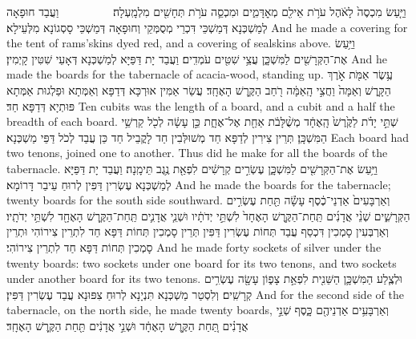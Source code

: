 {{וַיַּ֤עַשׂ מִכְסֶה֙ לָאֹ֔הֶל עֹרֹ֥ת אֵילִ֖ם מְאׇדָּמִ֑ים וּמִכְסֵ֛ה עֹרֹ֥ת תְּחָשִׁ֖ים מִלְמָֽעְלָה׃ \setuma         }
{וַעֲבַד חוּפָאָה לְמַשְׁכְּנָא דְּמַשְׁכֵּי דִּכְרֵי מְסֻמְּקֵי וְחוּפָאָה דְּמַשְׁכֵּי סָסְגוֹנָא מִלְּעֵילָא׃}
{And he made a covering for the tent of rams’skins dyed red, and a covering of sealskins above.}{}
{וַיַּ֥עַשׂ אֶת־הַקְּרָשִׁ֖ים לַמִּשְׁכָּ֑ן עֲצֵ֥י שִׁטִּ֖ים עֹמְדִֽים׃}
{וַעֲבַד יָת דַּפַּיָּא לְמַשְׁכְּנָא דְּאָעֵי שִׁטִּין קָיְמִין׃}
{And he made the boards for the tabernacle of acacia-wood, standing up.}{}
{עֶ֥שֶׂר אַמֹּ֖ת אֹ֣רֶךְ הַקָּ֑רֶשׁ וְאַמָּה֙ וַחֲצִ֣י הָֽאַמָּ֔ה רֹ֖חַב הַקֶּ֥רֶשׁ הָאֶחָֽד׃}
{עֲשַׂר אַמִּין אוּרְכָּא דְּדַפָּא וְאַמְּתָא וּפַלְגוּת אַמְּתָא פּוּתְיָא דְּדַפָּא חַד׃}
{Ten cubits was the length of a board, and a cubit and a half the breadth of each board.}{}
{שְׁתֵּ֣י יָדֹ֗ת לַקֶּ֙רֶשׁ֙ הָֽאֶחָ֔ד מְשֻׁ֨לָּבֹ֔ת אַחַ֖ת אֶל־אֶחָ֑ת כֵּ֣ן עָשָׂ֔ה לְכֹ֖ל קַרְשֵׁ֥י הַמִּשְׁכָּֽן׃}
{תְּרֵין צִירִין לְדַפָּא חַד מְשׁוּלְּבִין חַד לָקֳבֵיל חַד כֵּן עֲבַד לְכֹל דַּפֵּי מַשְׁכְּנָא׃}
{Each board had two tenons, joined one to another. Thus did he make for all the boards of the tabernacle.}{}
{וַיַּ֥עַשׂ אֶת־הַקְּרָשִׁ֖ים לַמִּשְׁכָּ֑ן עֶשְׂרִ֣ים קְרָשִׁ֔ים לִפְאַ֖ת נֶ֥גֶב תֵּימָֽנָה׃}
{וַעֲבַד יָת דַּפַּיָּא לְמַשְׁכְּנָא עֶשְׂרִין דַּפִּין לְרוּחַ עֵיבַר דָּרוֹמָא׃}
{And he made the boards for the tabernacle; twenty boards for the south side southward.}{}
{וְאַרְבָּעִים֙ אַדְנֵי־כֶ֔סֶף עָשָׂ֕ה תַּ֖חַת עֶשְׂרִ֣ים הַקְּרָשִׁ֑ים שְׁנֵ֨י אֲדָנִ֜ים תַּֽחַת־הַקֶּ֤רֶשׁ הָאֶחָד֙ לִשְׁתֵּ֣י יְדֹתָ֔יו וּשְׁנֵ֧י אֲדָנִ֛ים תַּֽחַת־הַקֶּ֥רֶשׁ הָאֶחָ֖ד לִשְׁתֵּ֥י יְדֹתָֽיו׃}
{וְאַרְבְּעִין סָמְכִין דִּכְסַף עֲבַד תְּחוֹת עֶשְׂרִין דַּפִּין תְּרֵין סָמְכִין תְּחוֹת דַּפָּא חַד לִתְרֵין צִירוֹהִי וּתְרֵין סָמְכִין תְּחוֹת דַּפָּא חַד לִתְרֵין צִירוֹהִי׃}
{And he made forty sockets of silver under the twenty boards: two sockets under one board for its two tenons, and two sockets under another board for its two tenons.}{}
{וּלְצֶ֧לַע הַמִּשְׁכָּ֛ן הַשֵּׁנִ֖ית לִפְאַ֣ת צָפ֑וֹן עָשָׂ֖ה עֶשְׂרִ֥ים קְרָשִֽׁים׃}
{וְלִסְטַר מַשְׁכְּנָא תִּנְיָנָא לְרוּחַ צִפּוּנָא עֲבַד עֶשְׂרִין דַּפִּין׃}
{And for the second side of the tabernacle, on the north side, he made twenty boards,}{}
{וְאַרְבָּעִ֥ים אַדְנֵיהֶ֖ם כָּ֑סֶף שְׁנֵ֣י אֲדָנִ֗ים תַּ֚חַת הַקֶּ֣רֶשׁ הָאֶחָ֔ד וּשְׁנֵ֣י אֲדָנִ֔ים תַּ֖חַת הַקֶּ֥רֶשׁ הָאֶחָֽד׃}
}
